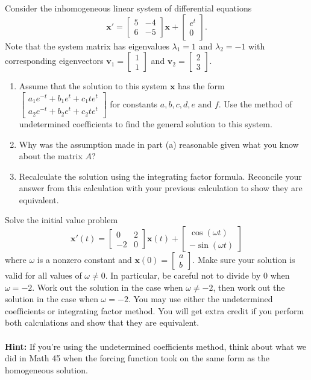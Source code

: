 \documentclass[12pt,letterpaper]{hmcpset}
\newcommand{\m}[1]{\begin{bmatrix} #1 \end{bmatrix}}
\renewcommand{\bf}[1]{\mathbf{#1}}
\begin{document}

\begin{problem}[1]
    Consider the inhomogeneous linear system of differential equations
    \[
        \bf{x}'=\m{5&-4\\6&-5}\bf{x}+\m{e^{t}\\0}.
    \]
    Note that the system matrix has eigenvalues $\lambda_1=1$ and
    $\lambda_2=-1$ with corresponding eigenvectors $\bf{v}_1=\m{1\\1}$
    and $\bf{v}_2=\m{2\\3}$.
    \begin{enumerate}
        \item Assume that the solution to this system $\bf{x}$ has the
            form
            $\m{a_1e^{-t}+b_1e^{t}+c_1te^{t}\\a_2e^{-t}+b_2e^{t}+c_2te^{t}}$
            for constants $a,b,c,d,e\mbox{ and }f$.  Use the method of
            undetermined coefficients to find the general solution to
            this system.
        \item Why was the assumption made in part (a) reasonable given
            what you know about the matrix $A$?
        \item Recalculate the solution using the integrating factor
            formula.  Reconcile your answer from this calculation with
            your previous calculation to show they are equivalent.
    \end{enumerate}
\end{problem}
\begin{solution}
    \vfill
\end{solution}
\newpage

\begin{problem}[2]
    Solve the initial value problem
    \[
        \bf{x}'(t)=\m{0&2\\-2&0}\bf{x}(t)
        +\m{\cos(\omega t)\\-\sin(\omega t)}
    \]
    where $\omega$ is a nonzero constant and
    $\bf{x}(0)=\m{a\\b}$. Make sure your solution is valid for all
    values of $\omega\neq0$.  In particular, be careful not to divide
    by 0 when $\omega=-2$.  Work out the solution in the case when
    $\omega\neq-2$, then work out the solution in the case when
    $\omega=-2$.  You may use either the undetermined coefficients or
    integrating factor method.  You will get extra credit if you
    perform both calculations and show that they are equivalent.\\\\
    \textbf{Hint:} If you're using the undetermined coefficients
    method, think about what we did in Math 45 when the forcing
    function took on the same form as the homogeneous solution.
\end{problem}
\begin{solution}
    \vfill
\end{solution}
\newpage
\end{document}
